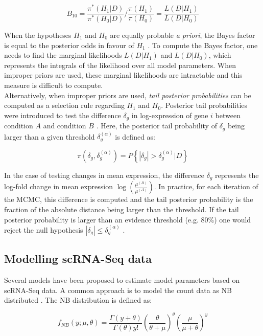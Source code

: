 \begin{equation}
B_{10}=\frac{\pi^*(H_1|D)}{\pi^*(H_0|D)}/{}\frac{\pi(H_1)}{\pi(H_0)}=\frac{L(D|H_1)}{L(D|H_0)}
\end{equation}  

When the hypotheses $H_1$ and $H_0$ are equally probable \emph{a priori}, the Bayes factor is equal to the posterior odds in favour of $H_1$ \citep{Kass1995}. To compute the Bayes factor, one needs to find the marginal likelihoods $L(D|H_1)$ and $L(D|H_0)$, which represents the integrals of the likelihood over all model parameters. When improper priors are used, these marginal likelihoods are intractable and this measure is difficult to compute. \\

Alternatively, when improper priors are used, \emph{tail posterior probabilities} can be computed as a selection rule regarding $H_1$ and $H_0$. Posterior tail probabilities were introduced to test the difference $\delta_g$ in log-expression of gene $i$ between condition $A$ and condition $B$ \citep{Bochkina2007}. Here, the posterior tail probability of $\delta_g$ being larger than a given threshold $\delta_g^{(\alpha)}$ is defined as:

\begin{equation}
\pi(\delta_g,\delta_g^{(\alpha)})=P\left\lbrace|\delta_g|>\delta_g^{(\alpha)}|D\right\rbrace
\end{equation}

In the case of testing changes in mean expression, the difference $\delta_g$ represents the log-fold change in mean expression $\log(\frac{\mu^{(B)}}{\mu^{(A)}})$. In practice, for each iteration of the MCMC, this difference is computed and the tail posterior probability is the fraction of the absolute distance being larger than the threshold. If the tail posterior probability is larger than an evidence threshold (e.g. 80\%) one would reject the null hypothesis $|\delta_g|\leq\delta_g^{(\alpha)}$ \citep{Vallejos2016}. 

\subsection{Modelling scRNA-Seq data}

Several models have been proposed to estimate model parameters based on scRNA-Seq data. A common approach is to model the count data as \gls{NB} distributed \citep{Vallejos2015BASiCS, Risso2018, Lopez2018}. The NB distribution is defined as:

\begin{equation}
f_{NB}(y;\mu,\theta)=\frac{\Gamma(y+\theta)}{\Gamma(\theta)y!}\left(\frac{\theta}{\theta + \mu}\right)^\theta\left(\frac{\mu}{\mu + \theta}\right)^y
\end{equation}

